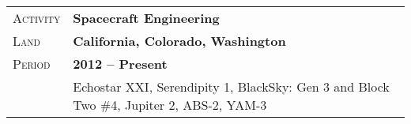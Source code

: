 \documentclass[a4paper, oneside, final]{scrartcl}
\newcommand{\gray}{\rowcolor[gray]{.90}} %
\begin{document}
\begin{center}

\begin{tabularx}{0.97\linewidth}{>{\raggedleft\scshape}p{2cm}X}
\gray Activity & \textbf{Spacecraft Engineering}\\
\gray Land & \textbf{California, Colorado, Washington} \hfill \\
\gray Period & \textbf{2012 -- Present}\\
&
\vspace{-0.15 cm}
Echostar XXI, Serendipity 1, BlackSky: Gen 3 and Block Two \#4, Jupiter 2, ABS-2, YAM-3
\\
\end{tabularx}



\end{center}
\end{document}
